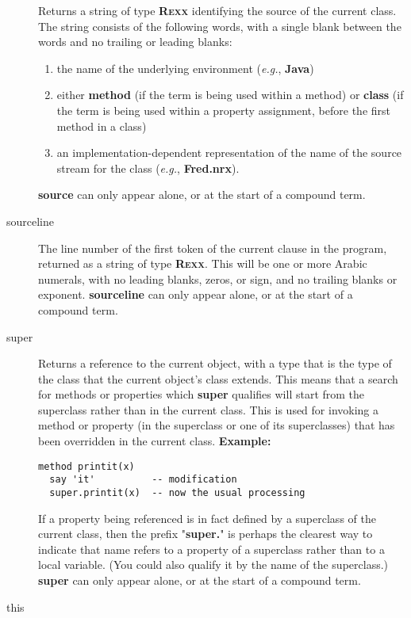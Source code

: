 \begin{description}
Returns a string of type \textbf{R\textsc{exx}} identifying the source of the
current class.
The string consists of the following words, with a single blank between
the words and no trailing or leading blanks:
\begin{enumerate}
\item the name of the underlying environment (\emph{e.g.}, \textbf{Java})
\item either \textbf{method} (if the term is being used within a method)
or \textbf{class} (if the term is being used within a property
assignment, before the first method in a class)
\item 
an implementation-dependent representation of the name of the
source stream for the class (\emph{e.g.}, \textbf{Fred.nrx}).
\end{enumerate}
 \textbf{source} can only appear alone, or at the start of a
compound term.
\item[sourceline]\label{refswsourl}
 
The line number of the first token of the current clause in the
\nr{} program, returned as a string of type \textbf{R\textsc{exx}}.
This will be one or more Arabic numerals, with no leading blanks, zeros,
or sign, and no trailing blanks or exponent.
 \textbf{sourceline} can only appear alone, or at the start of a
compound term.
\item[super]\label{refswsuper}
 
Returns a reference to the current object, with a type that is the
type of the class that the current object's class extends.
This means that a search for methods or properties
which \textbf{super} qualifies will start from the superclass rather
than in the current class.
This is used for invoking a method or property (in the superclass or one
of its superclasses) that has been overridden in the current class.
 \textbf{Example:}
\begin{lstlisting}
method printit(x)
  say 'it'          -- modification
  super.printit(x)  -- now the usual processing
\end{lstlisting}
 
If a property being referenced is in fact defined by a superclass of
the current class, then the prefix "\textbf{super.}" is perhaps
the clearest way to indicate that name refers to a property of a
superclass rather than to a local variable.
(You could also qualify it by the name of the superclass.)
 \textbf{super} can only appear alone, or at the start of a
compound term.
\item[this]\label{refswthis}
 

\end{description}
